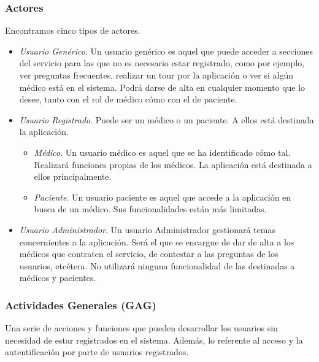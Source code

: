 \documentclass[a4paper,oneside,11pt]{book}
\begin{document}
			\subsubsection{Actores} %
			\label{sub:actores}
				Encontramos cinco tipos de actores.
				\begin{itemize}
					\item \textit{Usuario Genérico}. Un usuario genérico es aquel que puede acceder a secciones del servicio para las que no es necesario estar registrado, como por ejemplo, ver preguntas frecuentes, realizar un tour por la aplicación o ver si algún médico está en el sistema. Podrá darse de alta en cualquier momento que lo desee, tanto con el rol de médico cómo con el de paciente.
					\item \textit{Usuario Registrado}. Puede ser un médico o un paciente. A ellos está destinada la aplicación.
						\begin{itemize}
							\item \textit{Médico}. Un usuario médico es aquel que se ha identificado cómo tal. Realizará funciones propias de los médicos. La aplicación está destinada a ellos principalmente.
							\item \textit{Paciente}. Un usuario paciente es aquel que accede a la aplicación en busca de un médico. Sus funcionalidades están más limitadas.
						\end{itemize}
					\item \textit{Usuario Administrador}. Un usuario Administrador gestionará temas concernientes a la aplicación. Será el que se encargue de dar de alta a los médicos que contraten el servicio, de contestar a las preguntas de los usuarios, etcétera. No utilizará ninguna funcionalidad de las destinadas a médicos y pacientes.
					 
				\end{itemize}
			\newpage
			\subsubsection{Actividades Generales (GAG)} %
			\label{sub:actividades_generales_gag_}
			
				Una serie de acciones y funciones que pueden desarrollar los usuarios sin necesidad de estar registrados en el sistema. Además, lo referente al acceso y la autentificación por parte de usuarios registrados.
				\bigskip
			
\end{document}
